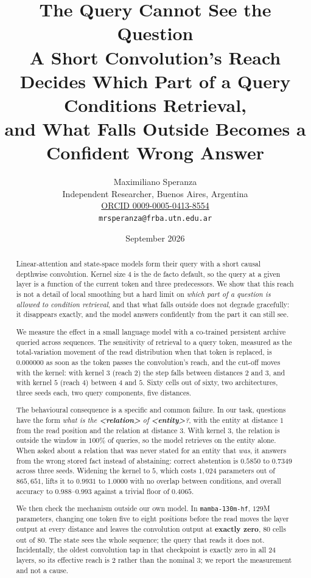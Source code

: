 \documentclass[11pt,a4paper]{article}
\title{\bfseries The Query Cannot See the Question\\
\large A Short Convolution's Reach Decides Which Part of a Query Conditions Retrieval,\\
and What Falls Outside Becomes a Confident Wrong Answer}
\author{Maximiliano Speranza\\
\small Independent Researcher, Buenos Aires, Argentina\\
\small \href{https://orcid.org/0009-0005-0413-8554}{ORCID 0009-0005-0413-8554}\\
\small \texttt{mrsperanza@frba.utn.edu.ar}}
\date{September 2026}
\begin{document}
\maketitle

\begin{abstract}
\noindent
Linear-attention and state-space models form their query with a short causal depthwise convolution.
Kernel size $4$ is the de facto default, so the query at a given layer is a function of the current
token and three predecessors. We show that this reach is not a detail of local smoothing but a hard limit on
\emph{which part of a question is allowed to condition retrieval}, and that what falls outside does
not degrade gracefully: it disappears exactly, and the model answers confidently from the part it can
still see.

We measure the effect in a small language model with a co-trained persistent archive queried across
sequences. The sensitivity of retrieval to a query token, measured as the total-variation movement of
the read distribution when that token is replaced, is $\mathbf{0.000000}$ as soon as the token passes
the convolution's reach, and the cut-off moves with the kernel: with kernel $3$ (reach $2$) the step
falls between distances $2$ and $3$, and with kernel $5$ (reach $4$) between $4$ and $5$. Sixty cells
out of sixty, two architectures, three seeds each, two query components, five distances.

The behavioural consequence is a specific and common failure. In our task, questions have the form
\emph{what is the \textbf{<relation>} of \textbf{<entity>}?}, with the entity at distance $1$ from the
read position and the relation at distance $3$. With kernel $3$, the relation is outside the window in
$100\%$ of queries, so the model retrieves on the entity alone. When asked about a relation that was
never stated for an entity that \emph{was}, it answers from the wrong stored fact instead of
abstaining: correct abstention is $0.5850$ to $0.7349$ across three seeds. Widening the kernel to $5$,
which costs $1{,}024$ parameters out of $865{,}651$, lifts it to $\mathbf{0.9931}$ to
$\mathbf{1.0000}$ with no overlap between conditions, and overall accuracy to $0.988$--$0.993$ against
a trivial floor of $0.4065$.

We then check the mechanism outside our own model. In \texttt{mamba-130m-hf}, $129$M parameters,
changing one token five to eight positions before the read moves the layer output at every distance
and leaves the convolution output at \textbf{exactly zero}, $80$ cells out of $80$. The state sees the
whole sequence; the query that reads it does not. Incidentally, the oldest convolution tap in that
checkpoint is exactly zero in all $24$ layers, so its effective reach is $2$ rather than the nominal
$3$; we report the measurement and not a cause.


\end{abstract}
\end{document}

